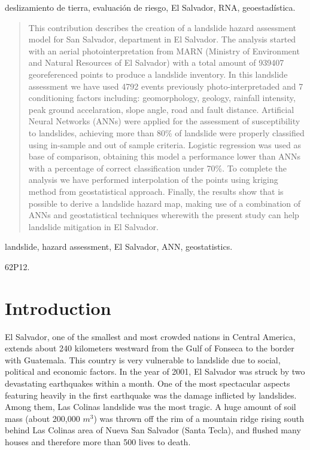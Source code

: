 \documentclass[11pt,twoside]{rmta2010esp}%
\begin{document}
\PC deslizamiento de tierra, evaluación de riesgo, El Salvador, RNA, geoestadística.

\begin{abstract}
This contribution describes the creation of a landslide hazard
assessment model for San Salvador, department in El Salvador. The analysis started with an aerial photointerpretation from  MARN (Ministry of Environment and Natural Resources of El Salvador)  with a total amount of 939407 georeferenced points to produce a landslide inventory. In this
landslide assessment we have used 4792 events previously photo-interpretaded
and 7 conditioning factors including: geomorphology, geology, rainfall intensity, peak ground accelaration, slope angle, road and fault distance. Artificial
Neural Networks (ANNs) were applied for the assessment of susceptibility to
landslides, achieving more than 80\% of landslide were properly classified using
in-sample and out of sample criteria. Logistic regression was used as base of
comparison, obtaining this model a performance lower than ANNs with a percentage of correct classification under 70\%. To complete the analysis we have
performed interpolation of the points using kriging method from geostatistical
approach. Finally, the results show that is possible to derive a landslide hazard map, making use of a combination of ANNs and geostatistical techniques
wherewith the present study can help landslide mitigation in El Salvador.
\end{abstract}

\KW landslide, hazard assessment, El Salvador, ANN, geostatistics.

\AMS 62P12.%



\section{Introduction}
\label{sec:intr}
El Salvador, one of the smallest and most crowded nations in Central America, extends about 240 kilometers westward from the 
Gulf of Fonseca to the border with Guatemala. This country is very vulnerable to landslide due to social, political and economic factors.
In the year of 2001, El Salvador was struck by two devastating earthquakes within a month. One of the most spectacular aspects featuring 
heavily in the first earthquake was the damage inflicted by landslides. Among them, Las Colinas landslide was the most tragic.
A huge amount of soil mass (about 200,000 $m^{3}$) was thrown off the rim of a mountain ridge rising south behind Las Colinas area 
of Nueva San Salvador (Santa Tecla), and flushed many houses and therefore more than 500 lives to death.
\end{document}
